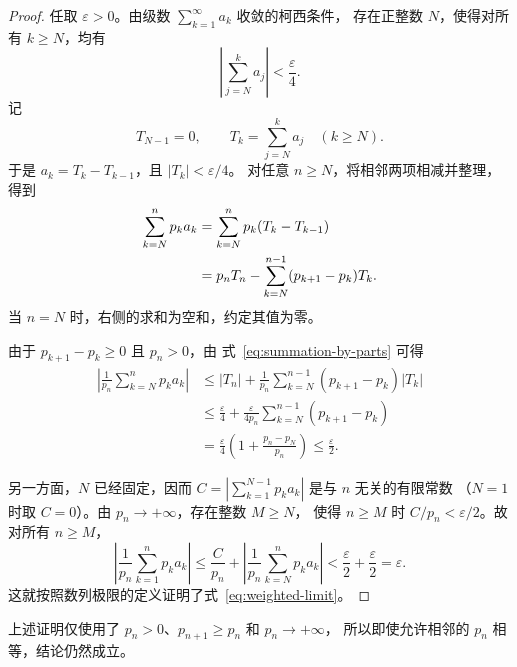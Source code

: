 \documentclass{ctexart}
\begin{document}
\begin{proof}\color{black}
任取 $\varepsilon>0$。由级数 $\sum_{k=1}^{\infty}a_k$ 收敛的柯西条件，
存在正整数 $N$，使得对所有 $k\ge N$，均有
\[
  \left|\sum_{j=N}^{k}a_j\right|<\frac{\varepsilon}{4}.
\]
记
\[
  T_{N-1}=0,\qquad
  T_k=\sum_{j=N}^{k}a_j\quad(k\ge N).
\]
于是 $a_k=T_k-T_{k-1}$，且 $|T_k|<\varepsilon/4$。
对任意 $n\ge N$，将相邻两项相减并整理，得到
\begin{align}
  \sum_{k=N}^{n}p_ka_k
  &=\sum_{k=N}^{n}p_k(T_k-T_{k-1})\notag\\
  &=p_nT_n-\sum_{k=N}^{n-1}(p_{k+1}-p_k)T_k.
  \label{eq:summation-by-parts}
\end{align}
当 $n=N$ 时，右侧的求和为空和，约定其值为零。

由于 $p_{k+1}-p_k\ge0$ 且 $p_n>0$，由
式~\eqref{eq:summation-by-parts} 可得
\begin{align*}
  \left|\frac{1}{p_n}\sum_{k=N}^{n}p_ka_k\right|
  &\le |T_n|+
       \frac{1}{p_n}\sum_{k=N}^{n-1}(p_{k+1}-p_k)|T_k|\\
  &\le \frac{\varepsilon}{4}
       +\frac{\varepsilon}{4p_n}
        \sum_{k=N}^{n-1}(p_{k+1}-p_k)\\
  &=\frac{\varepsilon}{4}
       \left(1+\frac{p_n-p_N}{p_n}\right)
   \le\frac{\varepsilon}{2}.
\end{align*}

另一方面，$N$ 已经固定，因而
$C=\left|\sum_{k=1}^{N-1}p_ka_k\right|$ 是与 $n$ 无关的有限常数
（$N=1$ 时取 $C=0$）。由 $p_n\to+\infty$，存在整数 $M\ge N$，
使得 $n\ge M$ 时 $C/p_n<\varepsilon/2$。故对所有 $n\ge M$，
\[
  \left|\frac{1}{p_n}\sum_{k=1}^{n}p_ka_k\right|
  \le\frac{C}{p_n}
       +\left|\frac{1}{p_n}\sum_{k=N}^{n}p_ka_k\right|
  <\frac{\varepsilon}{2}+\frac{\varepsilon}{2}
  =\varepsilon.
\]
这就按照数列极限的定义证明了式~\eqref{eq:weighted-limit}。
\end{proof}

上述证明仅使用了 $p_n>0$、$p_{n+1}\ge p_n$ 和 $p_n\to+\infty$，
所以即使允许相邻的 $p_n$ 相等，结论仍然成立。
\end{document}
